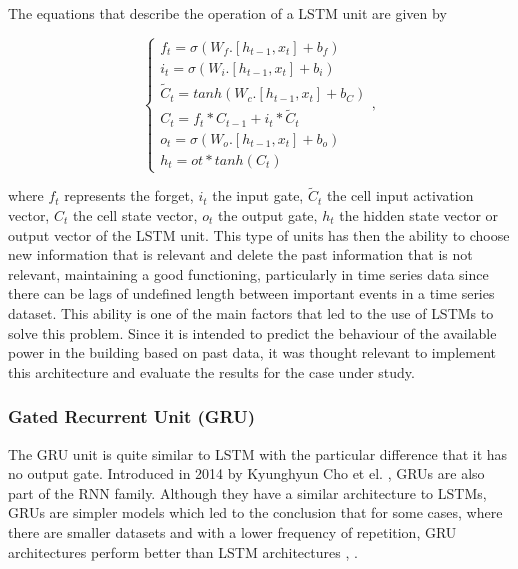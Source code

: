  


The equations that describe the operation of a \ac{LSTM} unit are given by 

\begin{equation}
    \begin{cases} 
        
        f_t=\sigma(W_f.[h_{t-1},x_t] + b_f)\\
        i_t=\sigma(W_i.[h_{t-1},x_t] + b_i)\\
        \widetilde{C}_t = tanh(W_c.[h_{t-1},x_t] + b_C)\\
        C_t=f_t*C_{t-1}+i_t* \widetilde{C}_t\\
        o_t=\sigma(W_o.[h_{t-1},x_t] + b_o)\\
        h_t=ot*tanh(C_t)
        
         
    \end{cases} ,
\end{equation}

where $f_t$ represents the forget, $i_t$ the input gate, $\widetilde{C}_t$ the cell input activation vector, ${C}_t$ the cell state vector, $o_t$ the output gate, $h_t$ the hidden state vector or output vector of the \ac{LSTM} unit. This type of units has then the ability to choose new information that is relevant and delete the past information that is not relevant, maintaining a good functioning, particularly in time series data since there can be lags of undefined length between important events in a time series dataset. This ability is one of the main factors that led to the use of \ac{LSTM}s to solve this problem. Since it is intended to predict the behaviour of the available power in the building based on past data, it was thought relevant to implement this architecture and evaluate the results for the case under study.

\subsubsection{Gated Recurrent Unit (GRU)}\label{chap3:subsubsec:gru}

The \ac{GRU} unit is quite similar to \ac{LSTM} with the particular difference that it has no output gate. Introduced in 2014 by Kyunghyun Cho et el. \cite{gru0}, \ac{GRU}s are also part of the \ac{RNN} family. Although they have a similar architecture to \ac{LSTM}s, \ac{GRU}s are simpler models which led to the conclusion that for some cases, where there are smaller datasets and with a lower frequency of repetition, \ac{GRU} architectures perform better than \ac{LSTM} architectures \cite{gru1}, \cite{gru2}.

